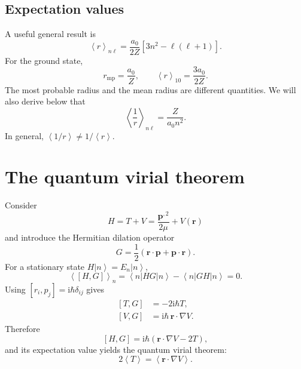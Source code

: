 \documentclass[11pt]{article}
\newcommand{\ii}{\mathrm{i}}
\newcommand{\avg}[1]{\left\langle #1\right\rangle}
\newcommand{\ket}[1]{\left\lvert #1\right\rangle}
\newcommand{\bra}[1]{\left\langle #1\right\rvert}
\newcommand{\comm}[2]{\left[#1,#2\right]}
\newcommand{\vect}[1]{\bm{#1}}
\begin{document}
\subsection{Expectation values}

A useful general result is
\begin{equation}
  \boxed{
  \avg{r}_{n\ell}
  =\frac{a_0}{2Z}\left[3n^2-\ell(\ell+1)\right]
  }.
\end{equation}
For the ground state,
\begin{equation}
  r_{\mathrm{mp}}=\frac{a_0}{Z},
  \qquad
  \avg{r}_{10}=\frac{3a_0}{2Z}.
\end{equation}
The most probable radius and the mean radius are different quantities.  We will
also derive below that
\begin{equation}
  \boxed{\avg{\frac{1}{r}}_{n\ell}=\frac{Z}{a_0n^2}}.
  \label{eq:inverse-r-expectation}
\end{equation}
In general, $\avg{1/r}\neq 1/\avg{r}$.

\section{The quantum virial theorem}

Consider
\begin{equation}
  H=T+V=\frac{\vect{p}^{,2}}{2\mu}+V(\vect{r})
\end{equation}
and introduce the Hermitian dilation operator
\begin{equation}
  \boxed{
  G=\frac{1}{2}\left(\vect{r}\cdot\vect{p}
  +\vect{p}\cdot\vect{r}\right)
  }.
\end{equation}
For a stationary state $H\ket{n}=E_n\ket{n}$,
\begin{equation}
  \avg{\comm{H}{G}}_n
  =\bra{n}HG\ket{n}-\bra{n}GH\ket{n}=0.
\end{equation}
Using $\comm{r_i}{p_j}=\ii\hbar\delta_{ij}$ gives
\begin{align}
  \comm{T}{G}&=-2\ii\hbar T,\\
  \comm{V}{G}&=\ii\hbar\,\vect{r}\cdot\nabla V.
\end{align}
Therefore
\begin{equation}
  \comm{H}{G}
  =\ii\hbar\left(\vect{r}\cdot\nabla V-2T\right),
\end{equation}
and its expectation value yields the quantum virial theorem:
\begin{equation}
  \boxed{2\avg{T}=\avg{\vect{r}\cdot\nabla V}}.
  \label{eq:virial-general}
\end{equation}
\end{document}
